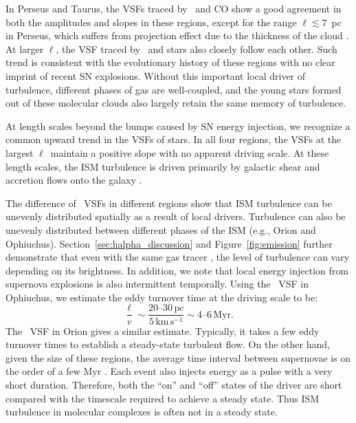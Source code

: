 In Perseus and Taurus, the VSFs traced by \halpha~and CO show a good agreement in both the amplitudes and slopes in these regions, except for the range $\ell \lesssim 7$~pc in Perseus, which suffers from projection effect due to the thickness of the cloud \citep[see Section 4.2 of][for a detailed discussion]{qian_new_2015}. At larger $\ell$, the VSF traced by \halpha~and stars also closely follow each other. Such trend is consistent with the evolutionary history of these regions with no clear imprint of recent SN explosions. Without this important local driver of turbulence, different phases of gas are well-coupled, and the young stars formed out of these molecular clouds also largely retain the same memory of turbulence. 

At length scales beyond the bumps caused by SN energy injection, we recognize a common upward trend in the VSFs of stars. In all four regions, the VSFs at the largest $\ell$~maintain a positive slope with no apparent driving scale. At these length scales, the ISM turbulence is driven primarily by galactic shear \citep[see, e.g.,][]{gammie_velocity_1991} and accretion flows onto the galaxy \citep[][]{forbes_gas_2023}.

The difference of \halpha~VSFs in different regions show that ISM turbulence can be unevenly distributed spatially as a result of local drivers. Turbulence can also be unevenly distributed between different phases of the ISM (e.g., Orion and Ophiuchus). Section~\ref{sec:halpha_discussion} and Figure~\ref{fig:emission} further demonstrate that even with the same gas tracer \halpha, the level of turbulence can vary depending on its brightness. In addition, we note that local energy injection from supernova explosions is also intermittent temporally. Using the \halpha~VSF in Ophiuchus, we estimate the eddy turnover time at the driving scale to be:
\begin{equation}
\frac{\ell}{v}\sim \frac{20\text{--}30\,\mathrm{pc}}{5\,\mathrm{km\,s^{-1}}}\sim 4\text{--}6\,\mathrm{Myr}.
\end{equation}
The \halpha~VSF in Orion gives a similar estimate. Typically, it takes a few eddy turnover times to establish a steady-state turbulent flow. On the other hand, given the size of these regions, the average time interval between supernovae is on the order of a few Myr \citep{narayan_pulsar_1990, li_supernova_2015}. Each event also injects energy as a pulse with a very short duration. Therefore, both the ``on'' and ``off'' states of the driver are short compared with the timescale required to achieve a steady state. Thus ISM turbulence in molecular complexes is often not in a steady state.


